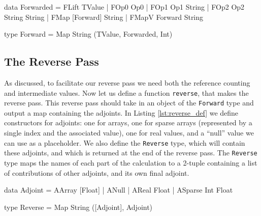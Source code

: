     \begin{haskell}[caption=Forward pass data structures, label=lst:forward, gobble=8]
        data Forwarded
            = FLift TValue
            | FOp0  Op0
            | FOp1  Op1       String
            | FOp2  Op2       String String
            | FMap  [Forward] String
            | FMapV Forward   String

        type Forward = Map String (TValue, Forwarded, Int)
    \end{haskell}

    \subsection{The Reverse Pass}
        As discussed, to facilitate our reverse pass we need both the reference counting and intermediate values.
        Now let us define a function \texttt{reverse}, that makes the reverse pass.
        This reverse pass should take in an object of the \texttt{Forward} type and output a map containing the adjoints.
        In Listing \ref{lst:reverse_def} we define constructors for adjoints: one for arrays, one for sparse arrays (represented by a single index and the associated value), one for real values, and a ``null'' value we can use as a placeholder.
        We also define the \texttt{Reverse} type, which will contain these adjoints, and which is returned at the end of the reverse pass.
        The \texttt{Reverse} type maps the names of each part of the calculation to a 2-tuple containing a list of contributions of other adjoints, and its own final adjoint.

        \begin{haskell}[caption=Definition of the \texttt{Reverse} type, label=lst:reverse_def, gobble=12]
            data Adjoint
                = AArray  [Float]
                | ANull
                | AReal   Float
                | ASparse Int Float

            type Reverse = Map String ([Adjoint], Adjoint)
        \end{haskell}

